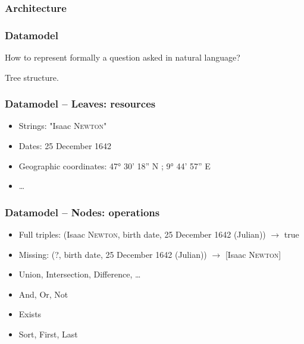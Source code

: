 \begin{frame}[fragile]
    \frametitle{Architecture}
    \begin{figure}
        \resizebox{.9\linewidth}{!}{
            
        }
    \end{figure}
\end{frame}

\begin{frame}[fragile]
    \frametitle{Datamodel}
    How to represent formally a question asked in natural language?

    \alert{Tree} structure.
\end{frame}
\begin{frame}[fragile]
    \frametitle{Datamodel \--- Leaves: resources}
        \begin{itemize}
            \item Strings: "Isaac \textsc{Newton}"
            \item Dates: 25 December 1642
            \item Geographic coordinates: 47° 30' 18'' N ; 9° 44' 57'' E
            \item \ldots
        \end{itemize}
\end{frame}
\begin{frame}[fragile]
    \frametitle{Datamodel \--- Nodes: operations}
        \begin{itemize}
            \item Full \alert{triples}: (Isaac \textsc{Newton}, birth date, 25 December 1642 (Julian)) $\rightarrow$ true
            \item Missing: (?, birth date, 25 December 1642 (Julian)) $\rightarrow$ [Isaac \textsc{Newton}]
            \item Union, Intersection, Difference, \ldots
            \item And, Or, Not
            \item Exists
            \item Sort, First, Last
        \end{itemize}
\end{frame}

